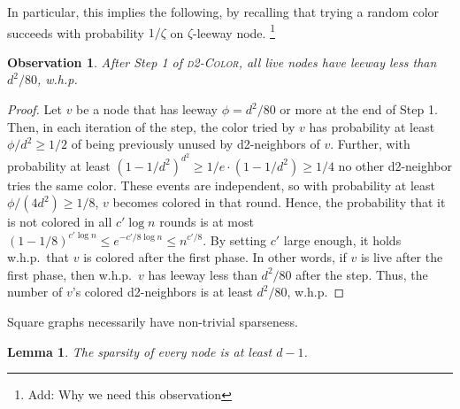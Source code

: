 \documentclass[12pt]{article}
\newtheorem{lemma}[theorem]{Lemma}
\newtheorem{observation}[theorem]{Observation}
\newcommand{\alg}[1]{\textsc{#1}}
\begin{document}
In particular, this implies the following, by recalling that trying a random color succeeds with probability $1/\zeta$ on $\zeta$-leeway node.
\footnote{Add: Why we need this observation}

\begin{observation}
After Step 1 of \alg{d2-Color}, all live nodes have leeway less than $d^2/80$, w.h.p. 
\label{obs:sparse}
\end{observation}

\begin{proof}
Let $v$ be a node that has leeway $\phi = d^2/80$ or more at the end of Step 1.
Then, in each iteration of the step, the color tried by $v$ has probability at least $\phi/d^2 \ge 1/2$ of being previously unused by d2-neighbors of $v$. Further, with probability at least $(1-1/d^2)^{d^2} \ge 1/e \cdot (1-1/d^2) \ge 1/4$ no other d2-neighbor tries the same color. These events are independent, so with probability at least $\phi/(4d^2) \ge 1/8$, $v$ becomes colored in that round. Hence, the probability that it is not colored in all $c' \log n$ rounds is at most $(1-1/8)^{c'\log n} \le e^{-c'/8 \log n} \le n^{c'/8}$.
By setting $c'$ large enough, it holds w.h.p.\ that $v$ is colored after the first phase.
In other words, if $v$ is live after the first phase, then w.h.p.\ $v$ has leeway less than $d^2 /80$ after the step. Thus, the number of $v$'s colored d2-neighbors is at least $d^2 /80$, w.h.p.
\end{proof}

Square graphs necessarily have non-trivial sparseness. 

\begin{lemma}
The sparsity of every node is at least $d-1$.
\label{l:sparse-lb}
\end{lemma}
\end{document}
